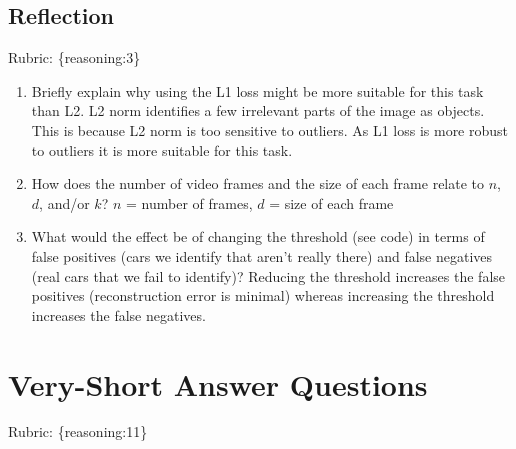\documentclass{article}
\def\rubric#1{\gre{Rubric: \{#1\}}}{}
\def\gre#1{{\color{gre}#1}}
\def\red#1{{\color{red}#1}}
\def\enum#1{\begin{enumerate}#1\end{enumerate}}
\begin{document}
\subsection{Reflection}
\rubric{reasoning:3}

\enum{
\item Briefly explain why using the L1 loss might be more suitable for this task than L2. \red{
L2 norm identifies a few irrelevant parts of the image as objects. This is because L2 norm is too sensitive to outliers. As L1 loss is more robust to outliers it is more suitable for this task.
}
\item How does the number of video frames and the size of each frame relate to $n$, $d$, and/or $k$? \red{ $n$ = number of frames, $d$ = size of each frame}
\item What would the effect be of changing the threshold (see code) in terms of false positives (cars we identify that aren't really there) and false negatives (real cars that we fail to identify)? \red{Reducing the threshold increases the false positives (reconstruction error is minimal) whereas increasing the threshold increases the false negatives.}
}

\section{Very-Short Answer Questions}
\rubric{reasoning:11}
\end{document}
